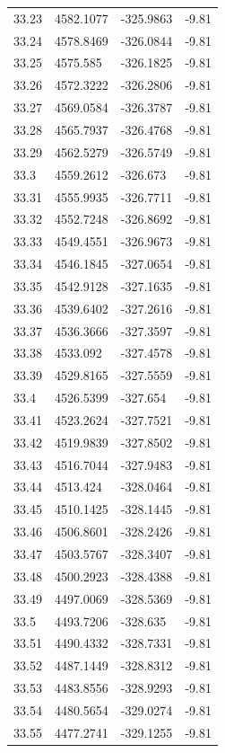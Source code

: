 \begin{table}[H]
\begin{tabular}{llll}
33.23 & 4582.1077 & -325.9863 & -9.81 \\
33.24 & 4578.8469 & -326.0844 & -9.81 \\
33.25 & 4575.585 & -326.1825 & -9.81 \\
33.26 & 4572.3222 & -326.2806 & -9.81 \\
33.27 & 4569.0584 & -326.3787 & -9.81 \\
33.28 & 4565.7937 & -326.4768 & -9.81 \\
33.29 & 4562.5279 & -326.5749 & -9.81 \\
33.3 & 4559.2612 & -326.673 & -9.81 \\
33.31 & 4555.9935 & -326.7711 & -9.81 \\
33.32 & 4552.7248 & -326.8692 & -9.81 \\
33.33 & 4549.4551 & -326.9673 & -9.81 \\
33.34 & 4546.1845 & -327.0654 & -9.81 \\
33.35 & 4542.9128 & -327.1635 & -9.81 \\
33.36 & 4539.6402 & -327.2616 & -9.81 \\
33.37 & 4536.3666 & -327.3597 & -9.81 \\
33.38 & 4533.092 & -327.4578 & -9.81 \\
33.39 & 4529.8165 & -327.5559 & -9.81 \\
33.4 & 4526.5399 & -327.654 & -9.81 \\
33.41 & 4523.2624 & -327.7521 & -9.81 \\
33.42 & 4519.9839 & -327.8502 & -9.81 \\
33.43 & 4516.7044 & -327.9483 & -9.81 \\
33.44 & 4513.424 & -328.0464 & -9.81 \\
33.45 & 4510.1425 & -328.1445 & -9.81 \\
33.46 & 4506.8601 & -328.2426 & -9.81 \\
33.47 & 4503.5767 & -328.3407 & -9.81 \\
33.48 & 4500.2923 & -328.4388 & -9.81 \\
33.49 & 4497.0069 & -328.5369 & -9.81 \\
33.5 & 4493.7206 & -328.635 & -9.81 \\
33.51 & 4490.4332 & -328.7331 & -9.81 \\
33.52 & 4487.1449 & -328.8312 & -9.81 \\
33.53 & 4483.8556 & -328.9293 & -9.81 \\
33.54 & 4480.5654 & -329.0274 & -9.81 \\
33.55 & 4477.2741 & -329.1255 & -9.81 \\

\end{tabular}
\end{table}
